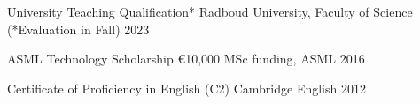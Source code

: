 

\begin{cvhonors}

  \cvhonor
    {University Teaching Qualification*} %
    {Radboud University, Faculty of Science (*Evaluation in Fall)} %
    {} %
    {2023} %

  \cvhonor
    {ASML Technology Scholarship} %
    {€10,000 MSc funding, ASML} %
    {} %
    {2016} %

  \cvhonor
    {Certificate of Proficiency in English (C2)} %
    {Cambridge English} %
    {} %
    {2012} %


\end{cvhonors}
